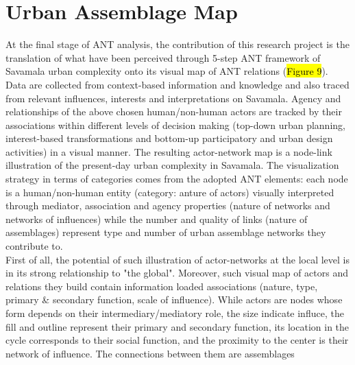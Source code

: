 \documentclass[11pt]{report}
\begin{document}

\section{Urban Assemblage Map}

At the final stage of ANT analysis, the contribution of this research project is the translation of what have been perceived through 5-step ANT framework of Savamala urban complexity onto its visual map of ANT relations (\hl{Figure 9}). 
\\

Data are collected from context-based information and knowledge and also traced from relevant influences, interests and interpretations on Savamala.
Agency and relationships of the above chosen human/non-human actors are tracked by their associations within different levels of decision making (top-down urban planning, interest-based transformations and bottom-up participatory and urban design activities) in a visual manner.
The resulting actor-network map is a node-link illustration of the present-day urban complexity in Savamala.
The visualization strategy in terms of categories comes from the adopted ANT elements: each node is a human/non-human entity (category: anture of actors) visually interpreted through mediator, association and agency properties (nature of networks and networks of influences) while the number and quality of links (nature of assemblages) represent type and number of urban assemblage networks they contribute to.
\\

First of all, the potential of such illustration of actor-networks at the local level is in its strong relationship to "the global".
Moreover, such visual map of actors and relations they build contain information loaded associations (nature, type, primary \& secondary function, scale of influence).
While actors are nodes whose form depends on their intermediary/mediatory role, the size indicate influce, the fill and outline represent their primary and secondary function, its location in the cycle corresponds to their social function, and the proximity to the center is their network of influence.
The connections between them are assemblages
\\
\end{document}
